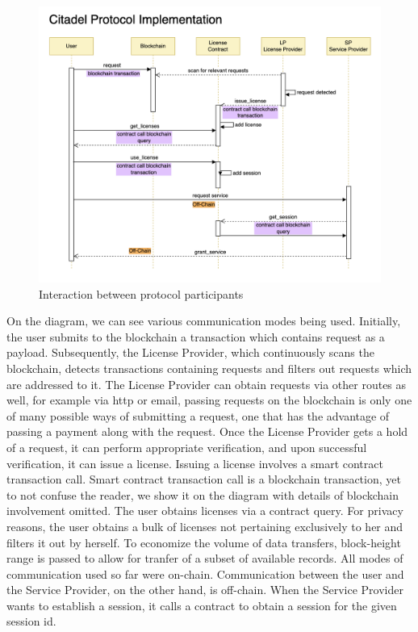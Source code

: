 \begin{figure}[h]
	\centering
		\includegraphics[width=390pt,draft=false]{images/implementation.png}
	\caption{Interaction between protocol participants}
	\label{fig:implementation}
\end{figure}

On the diagram, we can see various communication modes being used. Initially, the user submits to the blockchain a transaction which contains request as a payload. Subsequently, the License Provider, which continuously scans the blockchain, detects transactions containing requests and filters out requests which are addressed to it. The License Provider can obtain requests via other routes as well, for example via http or email, passing requests on the blockchain is only one of many possible ways of submitting a request, one that has the advantage of passing a payment along with the request. Once the License Provider gets a hold of a request, it can perform appropriate verification, and upon successful verification, it can issue a license. Issuing a license involves a smart contract transaction call. Smart contract transaction call is a blockchain transaction, yet to not confuse the reader, we show it on the diagram with details of blockchain involvement omitted. The user obtains licenses via a contract query. For privacy reasons, the user obtains a bulk of licenses not pertaining exclusively to her and filters it out by herself. To economize the volume of data transfers, block-height range is passed to allow for tranfer of a subset of available records. All modes of communication used so far were on-chain. Communication between the user and the Service Provider, on the other hand, is off-chain. When the Service Provider wants to establish a session, it calls a contract to obtain a session for the given session id.

